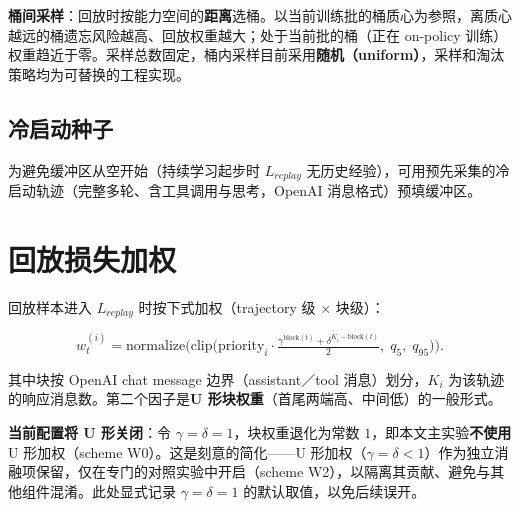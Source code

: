 \textbf{桶间采样}：回放时按能力空间的\textbf{距离}选桶。以当前训练批的桶质心为参照，离质心越远的桶遗忘风险越高、回放权重越大；处于当前批的桶（正在 on-policy 训练）权重趋近于零。采样总数固定，桶内采样目前采用\textbf{随机（uniform）}，采样和淘汰策略均为可替换的工程实现。

\subsection{冷启动种子}

为避免缓冲区从空开始（持续学习起步时 $L_{replay}$ 无历史经验），可用预先采集的冷启动轨迹（完整多轮、含工具调用与思考，OpenAI 消息格式）预填缓冲区。

\section{回放损失加权}
\label{sec:replay-weight}

回放样本进入 $L_{replay}$ 时按下式加权（trajectory 级 × 块级）：

\begin{equation}
  w_t^{(i)} = \text{normalize}\!\Big(\text{clip}\big(\text{priority}_i \cdot \tfrac{\gamma^{\text{block}(t)} + \delta^{K_i - \text{block}(t)}}{2},\; q_5,\; q_{95}\big)\Big).
\end{equation}

其中块按 OpenAI chat message 边界（assistant／tool 消息）划分，$K_i$ 为该轨迹的响应消息数。第二个因子是\textbf{U 形块权重}（首尾两端高、中间低）的一般形式。

\textbf{当前配置将 U 形关闭}：令 $\gamma=\delta=1$，块权重退化为常数 $1$，即本文主实验\textbf{不使用} U 形加权（scheme W0）。这是刻意的简化——U 形加权（$\gamma=\delta<1$）作为独立消融项保留，仅在专门的对照实验中开启（scheme W2），以隔离其贡献、避免与其他组件混淆。此处显式记录 $\gamma=\delta=1$ 的默认取值，以免后续误开。
